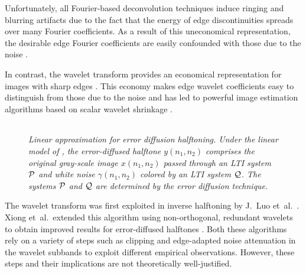 \documentclass[11pt]{article}
\def\nnnx {n_1}
\def\nnny {n_2}
\def\cP { {\cal{P}} }
\def\cQ { {\cal{Q}} }
\begin{document}
Unfortunately, all Fourier-based deconvolution techniques induce
ringing and blurring artifacts due to the fact that the energy of edge
discontinuities spreads over many Fourier coefficients.  As a result
of this uneconomical representation, the desirable edge Fourier
coefficients are easily confounded with those due to the noise
\cite{Donoho5,nonlin-soln-don,mallat-new}.

In contrast, the wavelet transform provides an economical
representation for images with sharp edges \cite{DeVore3}.  This
economy makes edge wavelet coefficients easy to distinguish from those
due to the noise and has led to powerful image estimation algorithms
based on scalar wavelet shrinkage
\cite{donoho-ideal-adaptation,mallat-new}.

\begin{figure}[tb]
\begin{center}
\begin{tabular}{c}

\end{tabular}
\end{center}
\caption{\small \sl {Linear approximation for error diffusion
halftoning. Under the linear model of \cite{Kite,KiteJournal}, the
error-diffused halftone $y(\nnnx,\nnny)$ comprises the original
gray-scale image $x(\nnnx,\nnny)$ passed through an LTI system $\cP$
and white noise $\gamma(\nnnx,\nnny)$ colored by an LTI system
$\cQ$. The systems $\cP$ and $\cQ$ are determined by the error
diffusion technique.}}
\label{basicLinear}
\end{figure}


The wavelet transform was first exploited in inverse halftoning by J.\
Luo et~al.\ \cite{DeQueiroz}. Xiong et~al.\ extended this algorithm
using non-orthogonal, redundant wavelets to obtain improved results
for error-diffused halftones \cite{Xiong}. Both these algorithms rely
on a variety of steps such as clipping and edge-adapted noise
attenuation in the wavelet subbands to exploit different empirical
observations. However, these steps and their implications are not
theoretically well-justified.
\end{document}
